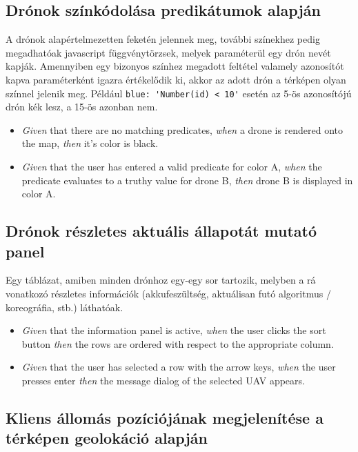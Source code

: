 \subsection{Drónok színkódolása predikátumok alapján}

A drónok alapértelmezetten feketén jelennek meg, további színekhez pedig megadhatóak javascript függvénytörzsek, melyek paraméterül egy drón nevét kapják.
Amennyiben egy bizonyos színhez megadott feltétel valamely azonosítót kapva paraméterként igazra értékelődik ki, akkor az adott drón a térképen olyan színnel jelenik meg.
Például \verb|blue: 'Number(id) < 10'| esetén az 5-ös azonosítójú drón kék lesz, a 15-ös azonban nem.

\begin {itemize}
  \item \textit{Given} that there are no matching predicates, \textit{when} a drone is rendered onto the map, \textit{then} it's color is black.
  \item \textit{Given} that the user has entered a valid predicate for color A, \textit{when} the predicate evaluates to a truthy value for drone B, \textit{then} drone B is displayed in color A.
\end {itemize}


\subsection{Drónok részletes aktuális állapotát mutató panel}

Egy táblázat, amiben minden drónhoz egy-egy sor tartozik, melyben a rá vonatkozó részletes információk (akkufeszültség, aktuálisan futó algoritmus / koreográfia, stb.) láthatóak.

\begin {itemize}
  \item \textit{Given} that the information panel is active, \textit{when} the user clicks the sort button \textit{then} the rows are ordered with respect to the appropriate column.
  \item \textit{Given} that the user has selected a row with the arrow keys, \textit{when} the user presses enter \textit{then} the message dialog of the selected UAV appears.
\end {itemize}


\subsection{Kliens állomás pozíciójának megjelenítése a térképen geolokáció alapján}

